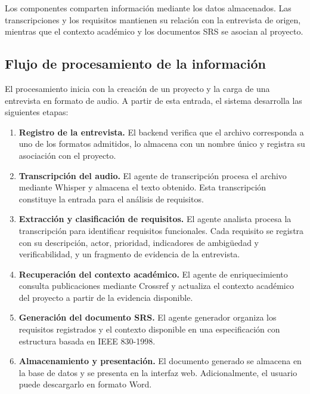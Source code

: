 Los componentes comparten información mediante los datos
almacenados. Las transcripciones y los requisitos mantienen
su relación con la entrevista de origen, mientras que
el contexto académico y los documentos SRS se asocian
al proyecto.

\subsection{Flujo de procesamiento de la información}

El procesamiento inicia con la creación de un proyecto y la
carga de una entrevista en formato de audio. A partir de esta
entrada, el sistema desarrolla las siguientes etapas:

\begin{enumerate}
    \item \textbf{Registro de la entrevista.}
    El backend verifica que el archivo corresponda a uno
    de los formatos admitidos, lo almacena con un nombre
    único y registra su asociación con el proyecto.

    \item \textbf{Transcripción del audio.}
    El agente de transcripción procesa el archivo mediante
    Whisper y almacena el texto obtenido. Esta transcripción
    constituye la entrada para el análisis de requisitos.

    \item \textbf{Extracción y clasificación de requisitos.}
    El agente analista procesa la transcripción para
    identificar requisitos funcionales. Cada requisito
    se registra con su descripción, actor, prioridad,
    indicadores de ambigüedad y verificabilidad, y
    un fragmento de evidencia de la entrevista.

  \item \textbf{Recuperación del contexto académico.}
    El agente de enriquecimiento consulta publicaciones
    mediante Crossref y actualiza el contexto académico
    del proyecto a partir de la evidencia disponible.

    \item \textbf{Generación del documento SRS.}
    El agente generador organiza los requisitos registrados
    y el contexto disponible en una especificación
    con estructura basada en IEEE 830-1998.

    \item \textbf{Almacenamiento y presentación.}
    El documento generado se almacena en la base de
    datos y se presenta en la interfaz web.
    Adicionalmente, el usuario puede descargarlo
    en formato Word.
\end{enumerate}

